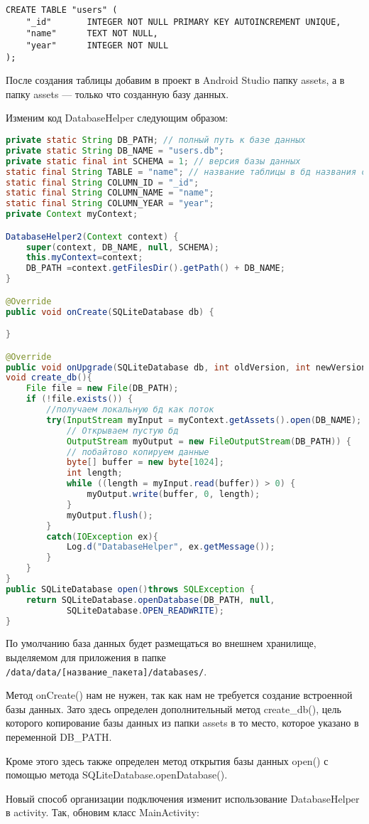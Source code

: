 \begin{verbatim}
CREATE TABLE "users" (
	"_id"		INTEGER NOT NULL PRIMARY KEY AUTOINCREMENT UNIQUE,
	"name"		TEXT NOT NULL,
	"year"		INTEGER NOT NULL
);
\end{verbatim}

После создания таблицы добавим в проект в Android Studio папку assets, а в
папку assets --- только что созданную базу данных.\par
Изменим код DatabaseHelper следующим образом:

\begin{lstlisting}[language=Java
	, label=lst:
	]
private static String DB_PATH; // полный путь к базе данных
private static String DB_NAME = "users.db";
private static final int SCHEMA = 1; // версия базы данных
static final String TABLE = "name"; // название таблицы в бд названия столбцов
static final String COLUMN_ID = "_id";
static final String COLUMN_NAME = "name";
static final String COLUMN_YEAR = "year";
private Context myContext;

DatabaseHelper2(Context context) {
	super(context, DB_NAME, null, SCHEMA);
	this.myContext=context;
	DB_PATH =context.getFilesDir().getPath() + DB_NAME;
}

@Override
public void onCreate(SQLiteDatabase db) {

}

@Override
public void onUpgrade(SQLiteDatabase db, int oldVersion, int newVersion) { }
void create_db(){
	File file = new File(DB_PATH);
	if (!file.exists()) {
		//получаем локальную бд как поток
		try(InputStream myInput = myContext.getAssets().open(DB_NAME);
			// Открываем пустую бд
			OutputStream myOutput = new FileOutputStream(DB_PATH)) {
			// побайтово копируем данные
			byte[] buffer = new byte[1024];
			int length;
			while ((length = myInput.read(buffer)) > 0) {
				myOutput.write(buffer, 0, length);
			}
			myOutput.flush();
		}
		catch(IOException ex){
			Log.d("DatabaseHelper", ex.getMessage());
		}
	}
}
public SQLiteDatabase open()throws SQLException {
	return SQLiteDatabase.openDatabase(DB_PATH, null,
			SQLiteDatabase.OPEN_READWRITE);
}
\end{lstlisting}

По умолчанию база данных будет размещаться во внешнем хранилище,
выделяемом для приложения в папке
\verb|/data/data/[название_пакета]/databases/|.\par
Метод onCreate() нам не нужен, так как нам не требуется создание
встроенной базы данных. Зато здесь определен дополнительный метод
create\_db(), цель которого копирование базы данных из папки assets в то
место, которое указано в переменной DB\_PATH.\par
Кроме этого здесь также определен метод открытия базы данных open() с
помощью метода SQLiteDatabase.openDatabase().\par
Новый способ организации подключения изменит использование
DatabaseHelper в activity. Так, обновим класс MainActivity:

